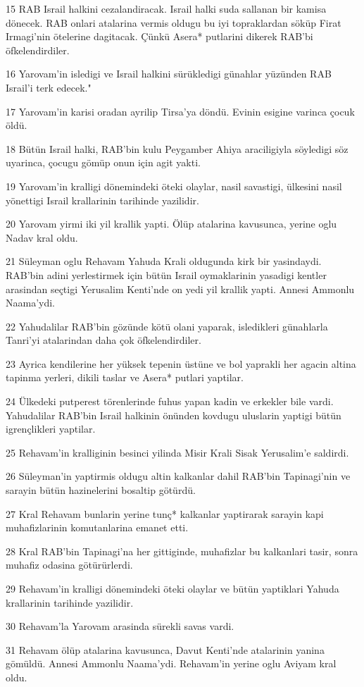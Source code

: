 \par 15 RAB Israil halkini cezalandiracak. Israil halki suda sallanan bir kamisa dönecek. RAB onlari atalarina vermis oldugu bu iyi topraklardan söküp Firat Irmagi'nin ötelerine dagitacak. Çünkü Asera* putlarini dikerek RAB'bi öfkelendirdiler.
\par 16 Yarovam'in isledigi ve Israil halkini sürükledigi günahlar yüzünden RAB Israil'i terk edecek."
\par 17 Yarovam'in karisi oradan ayrilip Tirsa'ya döndü. Evinin esigine varinca çocuk öldü.
\par 18 Bütün Israil halki, RAB'bin kulu Peygamber Ahiya araciligiyla söyledigi söz uyarinca, çocugu gömüp onun için agit yakti.
\par 19 Yarovam'in kralligi dönemindeki öteki olaylar, nasil savastigi, ülkesini nasil yönettigi Israil krallarinin tarihinde yazilidir.
\par 20 Yarovam yirmi iki yil krallik yapti. Ölüp atalarina kavusunca, yerine oglu Nadav kral oldu.
\par 21 Süleyman oglu Rehavam Yahuda Krali oldugunda kirk bir yasindaydi. RAB'bin adini yerlestirmek için bütün Israil oymaklarinin yasadigi kentler arasindan seçtigi Yerusalim Kenti'nde on yedi yil krallik yapti. Annesi Ammonlu Naama'ydi.
\par 22 Yahudalilar RAB'bin gözünde kötü olani yaparak, isledikleri günahlarla Tanri'yi atalarindan daha çok öfkelendirdiler.
\par 23 Ayrica kendilerine her yüksek tepenin üstüne ve bol yaprakli her agacin altina tapinma yerleri, dikili taslar ve Asera* putlari yaptilar.
\par 24 Ülkedeki putperest törenlerinde fuhus yapan kadin ve erkekler bile vardi. Yahudalilar RAB'bin Israil halkinin önünden kovdugu uluslarin yaptigi bütün igrençlikleri yaptilar.
\par 25 Rehavam'in kralliginin besinci yilinda Misir Krali Sisak Yerusalim'e saldirdi.
\par 26 Süleyman'in yaptirmis oldugu altin kalkanlar dahil RAB'bin Tapinagi'nin ve sarayin bütün hazinelerini bosaltip götürdü.
\par 27 Kral Rehavam bunlarin yerine tunç* kalkanlar yaptirarak sarayin kapi muhafizlarinin komutanlarina emanet etti.
\par 28 Kral RAB'bin Tapinagi'na her gittiginde, muhafizlar bu kalkanlari tasir, sonra muhafiz odasina götürürlerdi.
\par 29 Rehavam'in kralligi dönemindeki öteki olaylar ve bütün yaptiklari Yahuda krallarinin tarihinde yazilidir.
\par 30 Rehavam'la Yarovam arasinda sürekli savas vardi.
\par 31 Rehavam ölüp atalarina kavusunca, Davut Kenti'nde atalarinin yanina gömüldü. Annesi Ammonlu Naama'ydi. Rehavam'in yerine oglu Aviyam kral oldu.

